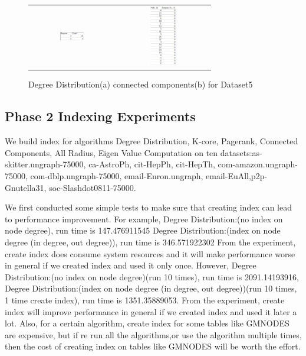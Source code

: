 \begin{figure}[H]
\begin{center}
\begin{tabular}{cc}
     \includegraphics[width=0.3\textwidth]{FIG/5dd.jpg} &
     \includegraphics[width=0.3\textwidth]{FIG/5cc.jpg} \\
\end{tabular}
\caption{Degree Distribution(a) connected components(b) for Dataset5}
\end{center}
\end{figure}

\subsection{Phase 2 Indexing Experiments}

We build index for algorithms Degree Distribution, K-core, Pagerank, Connected Components, All Radius, Eigen Value Computation on ten datasets:as-skitter.ungraph-75000, ca-AstroPh, cit-HepPh, cit-HepTh, com-amazon.ungraph-75000, com-dblp.ungraph-75000, email-Enron.ungraph, email-EuAll,p2p-Gnutella31, soc-Slashdot0811-75000.

We first conducted some simple tests to make sure that creating index can lead to performance improvement.
For example, 
Degree Distribution:(no index on node degree), run time is 147.476911545
Degree Distribution:(index on node degree (in degree, out degree)), run time is 346.571922302
From the experiment, create index does consume system resources and it will make performance worse in general if we
created index and used it only once.
However, 
Degree Distribution:(no index on node degree)(run 10 times), run time is 2091.14193916,
Degree Distribution:(index on node degree (in degree, out degree))(run 10 times, 1 time create index), run time is 1351.35889053.
From the experiment, create index will improve performance in general if we created index and used it later a lot.
Also, for a certain algorithm, create index for some tables like GMNODES are expensive, but if re run all the algorithms,or use the algorithm multiple times, then the cost of creating index on tables like GMNODES will be worth the effort.

